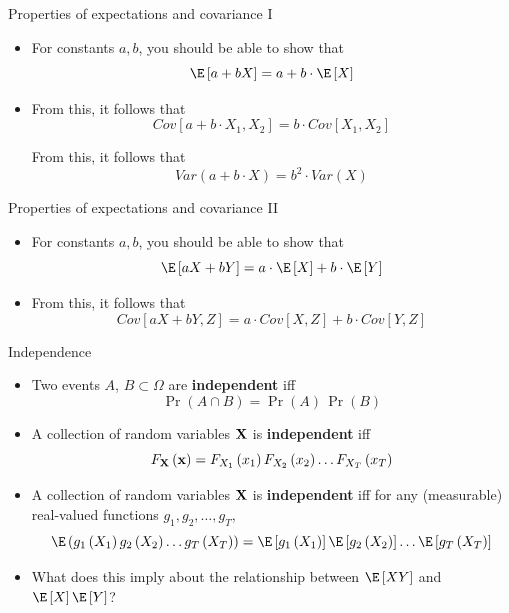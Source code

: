 \documentclass[aspectratio=169,11pt]{beamer}
\begin{document}
\begin{frame}{Properties of expectations and covariance I}
\begin{itemize}
	\item For constants $a,b$, you should be able to show that\[
		\E\left[ a + b X\right] = a + b \cdot \E\left[ X\right] 
	\]

	\medskip
	\item From this, it follows that\[
		Cov\left[ a + b \cdot X_1 , X_2 \right] = b \cdot Cov\left[X_1 , X_2 \right] 
	\]

	\medskip From this, it follows that\[
			Var\left(a + b \cdot X\right) = b^2 \cdot Var\left( X\right) 
	\]
\end{itemize}
\end{frame}


\begin{frame}{Properties of expectations and covariance II}
\begin{itemize}
	\item For constants $a,b$, you should be able to show that\[
		\E\left[ a X + b Y\right] = a  \cdot \E\left[ X\right] + b \cdot \E\left[ Y\right] 
	\]

	\medskip
	\item From this, it follows that\[
		Cov\left[ a X + b Y, Z \right] = a \cdot Cov\left[X , Z\right] + b \cdot Cov\left[Y , Z\right] 
	\]
\end{itemize}
\end{frame}



\begin{frame}{Independence}
\begin{itemize}
	\item Two events $A$, $B \subset \Omega$  are {\bf independent} iff\[
		\Pr\left(A\cap B\right) = \Pr\left( A\right)\, \Pr\left( B\right)
	\]
	
	\medskip
	\item A collection of random variables ${\bf X}$ is {\bf independent} iff\[
		F_{{\bf X}} \left({\bf x}\right) = F_{X_1}\left(x_1\right) F_{X_2}\left(x_2\right) \dots F_{X_T}\left(x_T\right) 
	\]
	
		\medskip
	\item A collection of random variables ${\bf X}$ is {\bf independent} iff for any (measurable) real-valued functions $g_1,g_2,\dots,g_T$, \[
		\E \left(g_1\left(X_1\right)g_2\left(X_2\right)\dots g_T\left(X_T\right)\right) = \E\left[g_1\left(X_1\right)\right] \E\left[g_2\left(X_2\right)\right] \dots \E\left[g_T\left(X_T\right)\right]
	\]
	
	
	\medskip
	\item What does this imply about the relationship between $\E\left[X Y\right]$ and $\E\left[X\right] \E\left[Y\right]$? 
			
\end{itemize}
\end{frame}
\end{document}
